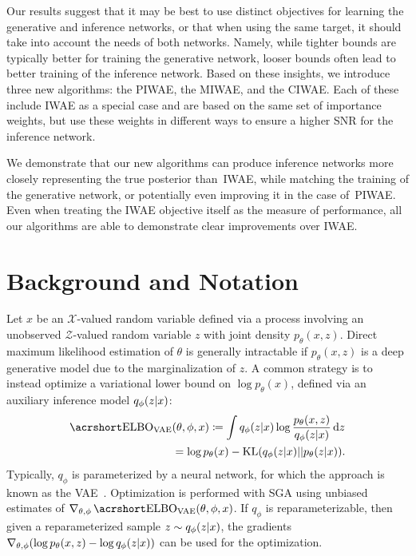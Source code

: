 Our results suggest that it may be best to use distinct objectives for learning
the generative and inference networks, or that when using the same target, it should
take into account the needs of both networks.
Namely, while tighter bounds are typically better for training
the generative network, looser bounds often lead to better
training of the inference network.
Based on these insights, we introduce three new algorithms: the \gls{PIWAE}, the \gls{MIWAE}, and the \gls{CIWAE}. Each of these include \gls{IWAE} as a special case and are based on the same set of importance weights, 
but use these weights in different ways to ensure a higher SNR for the
inference network.  

We demonstrate that
our new algorithms can produce inference networks more closely representing the true posterior
than~\gls{IWAE}, while matching the
training of the generative network, or potentially even improving it in the case of~\gls{PIWAE}. 
Even when treating the \gls{IWAE} 
objective itself as the measure of performance, all our algorithms are able to demonstrate clear
improvements over \gls{IWAE}.


\section{Background and Notation}

Let $x$ be an $\mathcal{X}$-valued random variable defined via a process involving an unobserved $\mathcal{Z}$-valued random variable $z$ with joint density $p_{\theta}(x, z)$. Direct maximum likelihood estimation of $\theta$ is generally intractable if  $p_{\theta}(x, z)$ is a deep generative model due to the marginalization of $z$. A common strategy is to instead optimize a variational lower bound on $\log p_{\theta}(x)$, defined via an auxiliary inference model $q_{\phi}(z \lvert x)$:
\begin{align}
	\ELBO_{\text{VAE}} &(\theta, \phi, x) \coloneqq \int q_{\phi}(z \given x) \log \frac{p_{\theta}(x, z)} {q_{\phi}(z \given x)} \,\mathrm dz \nonumber \\
	&= \log p_{\theta}(x) - \mathrm{KL}(q_{\phi}(z \given x) || p_{\theta}(z \given x)). \label{eqn:intro/elbo_vae}
\end{align}
Typically, $q_{\phi}$ is parameterized by a neural network, for which the approach is known as the \gls{VAE}~\citep{Kingma2014auto,Rezende2014stochastic}. Optimization
is performed with \gls{SGA} using unbiased estimates of $\nabla_{\theta, \phi} \ELBO_{\text{VAE}}(\theta, \phi, x)$. If $q_{\phi}$ is reparameterizable, %
then given a reparameterized sample  $z \sim q_{\phi}(z  \lvert x)$, the gradients $\nabla_{\theta, \phi} (\log p_{\theta}(x, z) - \log q_{\phi}(z \lvert x))$ can be used for the 
optimization.

